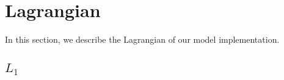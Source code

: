 \section{\label{lagrangians}Lagrangian}
In this section, we describe the Lagrangian of our model implementation.
\subsection{\label{L1}$L{}_1$}
\begin{sloppypar}\begin{flushleft}$

\end{flushleft}
\end{sloppypar}
